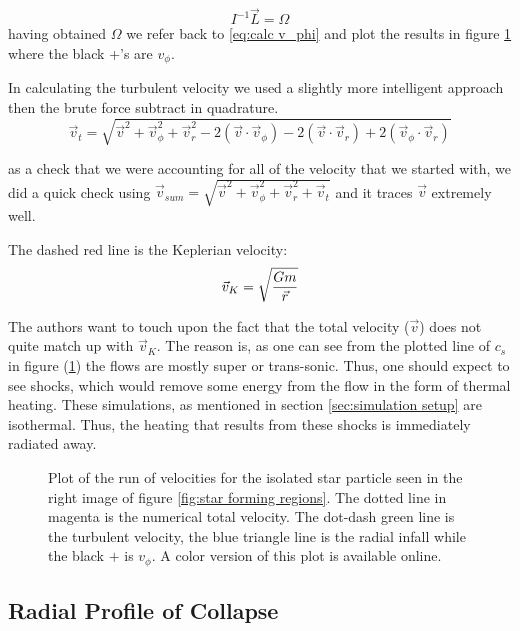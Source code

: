 \documentclass{emulateapj}
\newcommand{\be}{\begin{equation}}
\newcommand{\ee}{\end{equation}}
\begin{document}
\be
I^{-1}\vec{L} = \Omega
\label{eq:Obtain Omega}
\ee
having obtained $\Omega$ we refer back to \ref{eq:calc v_phi} and plot the results in figure \ref{fig:quad3_320_velocity} where the black +'s are $v_{\phi}$.

In calculating the turbulent velocity we used a slightly more intelligent approach then the brute force subtract in quadrature.
\be
\vec{v}_{t} = \sqrt{\vec{v}^2 + \vec{v}_{\phi}^2 + \vec{v}_{r}^2 - 2(\vec{v} \cdot \vec{v}_{\phi}) - 2(\vec{v} \cdot \vec{v}_{r}) + 2(\vec{v}_{\phi} \cdot \vec{v}_{r})}
\label{eq:Vrms subtraction}
\ee

as a check that we were accounting for all of the velocity that we started with, we did a quick check using $\vec{v}_{sum} = \sqrt{\vec{v}^2 + \vec{v}_{\phi}^2 + \vec{v}_{r}^2 + \vec{v}_{t}}$ and it traces $\vec{v}$ extremely well.

The dashed red line is the Keplerian velocity:
\be
\vec{v}_{K} = \sqrt{G m \over \vec{r}}
\label{eq:Kepler velocity}
\ee

The authors want to touch upon the fact that the total velocity ($\vec{v}$) does not quite match up with $\vec{v}_{K}$. The reason is, as one can see from the plotted line of $c_s$ in figure (\ref{fig:quad3_320_velocity}) the flows are mostly super or trans-sonic. Thus, one should expect to see shocks, which would remove some energy from the flow in the form of thermal heating. These simulations, as mentioned in section \ref{sec:simulation setup} are isothermal. Thus, the heating that results from these shocks is immediately radiated away.

%


\begin{figure}
\caption{Plot of the run of velocities for the isolated star particle seen in the right image of figure \ref{fig:star forming regions}. The dotted line in magenta is the numerical total velocity. The dot-dash green line is the turbulent velocity, the blue triangle line is the radial infall while the black $+$ is $v_{\phi}$. A color version of this plot is available online.
\label{fig:quad3_320_velocity}}
\end{figure}

\subsection{Radial Profile of Collapse}
\end{document}
